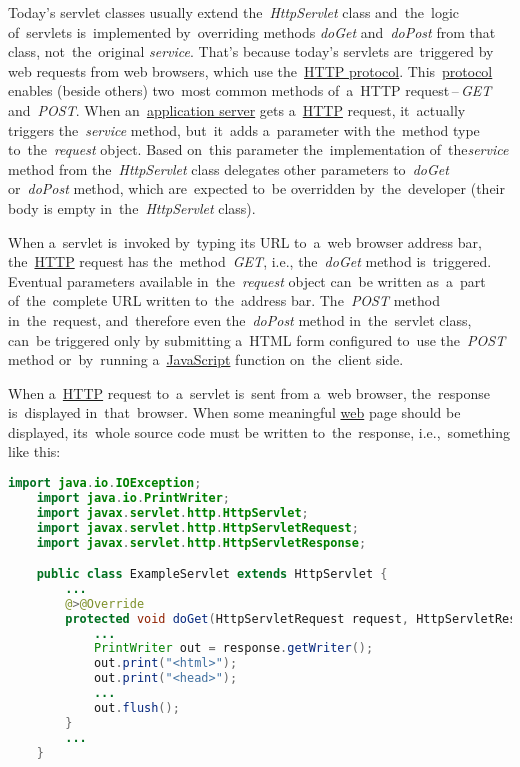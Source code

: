 \label{servicedopostdoget}
 Today's servlet classes usually extend the~\textit{HttpServlet} class and~the~logic of~servlets is~implemented by~overriding methods \textit{doGet} and~\textit{doPost} from that class, not~the~original \textit{service}.
That's because today's servlets are~triggered by web requests from web browsers, which use the~\hyperref[http]{HTTP protocol}.
This~\hyperref[protocolstandard]{protocol} enables (beside others) two~most common methods of~a~HTTP request\,--\,\textit{GET} and~\textit{POST}.
When an~\hyperref[applicationserver]{application server} gets a~\hyperref[http]{HTTP} request, it~actually triggers the~\textit{service} method, but~it~adds a~parameter with the~method type to~the~\textit{request} object.
Based on~this parameter the~implementation of~the\textit{service} method from the~\textit{HttpServlet} class delegates other parameters to~\textit{doGet} or~\textit{doPost} method, which are~expected to~be overridden by~the~developer (their body is empty in~the~\textit{HttpServlet} class).

When a~servlet is~invoked by~typing its URL to~a~web browser address bar, the~\hyperref[http]{HTTP} request has the~method~\textit{GET}, i.e., the~\textit{doGet} method is~triggered.
Eventual parameters available in~the~\textit{request} object can~be written as~a~part of~the~complete URL written to~the~address bar.
The~\textit{POST} method in~the~request, and~therefore even the~\textit{doPost} method in~the~servlet class, can~be triggered only by submitting a~HTML form configured to~use the~\textit{POST} method or~by~running a~\hyperref[javascript]{JavaScript} function on~the~client side.

\label{jsp}
When a~\hyperref[http]{HTTP} request to~a~servlet is~sent from a~web browser, the~response is~displayed in~that~browser.
When some meaningful \hyperref[internetweb]{web} page should be displayed, its~whole source code must be written to~the~response, i.e.,~something like this:

\begin{lstlisting}[language=Java]
    import java.io.IOException;
    import java.io.PrintWriter;
    import javax.servlet.http.HttpServlet;
    import javax.servlet.http.HttpServletRequest;
    import javax.servlet.http.HttpServletResponse;

    public class ExampleServlet extends HttpServlet {
        ...
        @>@Override
        protected void doGet(HttpServletRequest request, HttpServletResponse response) throws IOException {
            ...
            PrintWriter out = response.getWriter();
            out.print("<html>");
            out.print("<head>");
            ...
            out.flush();
        }
        ...
    }
\end{lstlisting}

